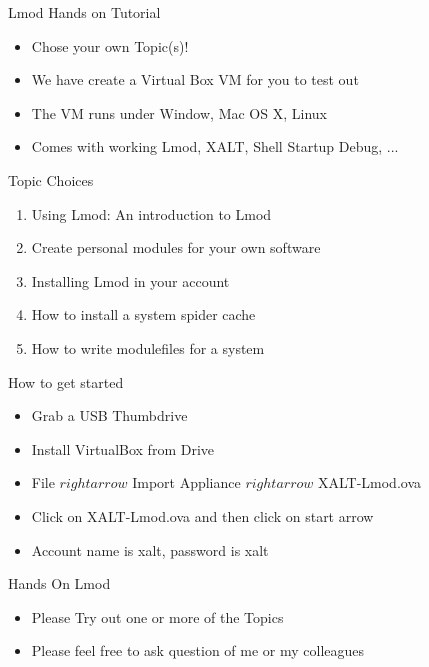\documentclass{beamer}
\begin{document}
\begin{frame}{Lmod Hands on Tutorial}
  \begin{itemize}
    \item Chose your own Topic(s)!
    \item We have create a Virtual Box VM for you to test out
    \item The VM runs under Window, Mac OS X, Linux
    \item Comes with working Lmod, XALT, Shell Startup Debug, ...
  \end{itemize}
\end{frame}

\begin{frame}{Topic Choices}
  \begin{enumerate}
    \item Using Lmod: An introduction to Lmod 
    \item Create personal modules for your own software
    \item Installing Lmod in your account
    \item How to install a system spider cache
    \item How to write modulefiles for a system
  \end{enumerate}
\end{frame}


\begin{frame}{How to get started}
  \begin{itemize}
    \item Grab a USB Thumbdrive
    \item Install VirtualBox from Drive
    \item File $rightarrow$ Import Appliance $rightarrow$
      XALT-Lmod.ova
    \item Click on XALT-Lmod.ova and then click on start arrow
    \item Account name is xalt, password is xalt  
  \end{itemize}
\end{frame}

\begin{frame}{Hands On Lmod}
  \begin{itemize}
    \item Please Try out one or more of the Topics
    \item Please feel free to ask question of me or my colleagues
  \end{itemize}
\end{frame}
\end{document}
